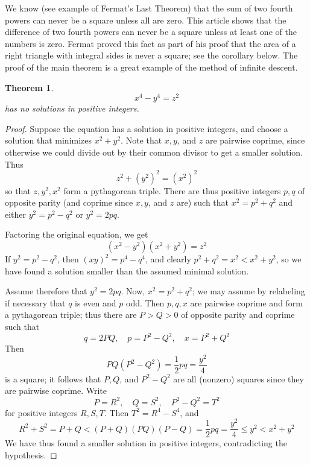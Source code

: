 \documentclass[12pt]{article}
\newtheorem{thm}{Theorem}
\begin{document}
We know (see example of Fermat's Last Theorem) that the sum of two fourth powers can never be a square unless all are zero. This article shows that the difference of two fourth powers can never be a square unless at least one of the numbers is zero. Fermat proved this fact as part of his proof that the area of a right triangle with integral sides is never a square; see the corollary below. The proof of the main theorem is a great example of the method of infinite descent.

\begin{thm}
\[x^4-y^4=z^2\]
has no solutions in positive integers.
\end{thm}
\begin{proof}
Suppose the equation has a solution in positive integers, and choose a solution that minimizes $x^2+y^2$. Note that $x,y$, and $z$ are pairwise coprime, since otherwise we could divide out by their common divisor to get a smaller solution. Thus
\[z^2 + (y^2)^2 = (x^2)^2\]
so that $z, y^2, x^2$ form a pythagorean triple. There are thus positive integers $p,q$ of opposite parity (and coprime since $x, y$, and $z$ are) such that $x^2 = p^2+q^2$ and either $y^2 = p^2-q^2$ or $y^2 = 2pq$.

Factoring the original equation, we get
\[(x^2-y^2)(x^2+y^2)=z^2\]
If $y^2 = p^2-q^2$, then $(xy)^2 = p^4-q^4$, and clearly $p^2+q^2 = x^2 < x^2+y^2$, so we have found a solution smaller than the assumed minimal solution.

Assume therefore that $y^2 = 2pq$. Now, $x^2 = p^2+q^2$; we may assume by relabeling if necessary that $q$ is even and $p$ odd. Then $p, q, x$ are pairwise coprime and form a pythagorean triple; thus there are $P>Q>0$ of opposite parity and coprime such that 
\[
  q = 2PQ,\quad p=P^2-Q^2,\quad x=P^2+Q^2
\]
Then
\[
  PQ(P^2-Q^2) = \frac{1}{2}pq = \frac{y^2}{4}
\]
is a square; it follows that $P, Q$, and $P^2-Q^2$ are all (nonzero) squares since they are pairwise coprime. Write
\[
  P = R^2,\quad Q=S^2,\quad P^2-Q^2=T^2
\]
for positive integers $R,S,T$. Then $T^2=R^4-S^4$, and
\[
  R^2+S^2 = P+Q < (P+Q)(PQ)(P-Q) = \frac{1}{2}pq = \frac{y^2}{4}\leq y^2 < x^2+y^2
\]
We have thus found a smaller solution in positive integers, contradicting the hypothesis.
\end{proof}
\end{document}
